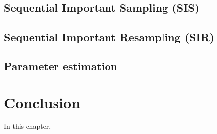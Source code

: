 \subsection{Sequential Important Sampling (SIS)}

\subsection{Sequential Important Resampling (SIR)}

\subsection{Parameter estimation}


\section{Conclusion}
In this chapter, 
